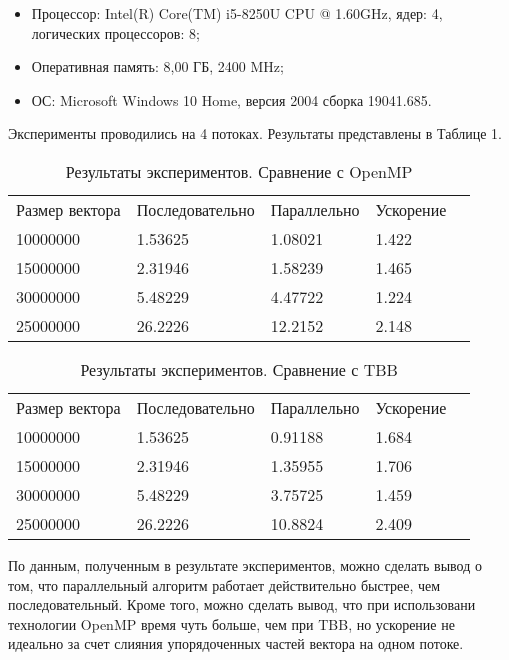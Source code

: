 \documentclass{report}
\begin{document}
\begin{itemize}
\item Процессор: Intel(R) Core(TM) i5-8250U CPU @ 1.60GHz, ядер: 4, логических процессоров: 8;
\item Оперативная память: 8,00 ГБ, 2400 MHz;
\item ОС: Microsoft Windows 10 Home, версия 2004 сборка 19041.685.
\end{itemize}

\par Эксперименты проводились на 4 потоках. Результаты представлены в Таблице 1.

\begin{table}[!h]
\caption{Результаты экспериментов. Сравнение с OpenMP}
\centering
\begin{tabular}{lllll}
Размер вектора & Последовательно & Параллельно & Ускорение   \\
10000000       & 1.53625         & 1.08021     & 1.422       \\
15000000       & 2.31946         & 1.58239     & 1.465       \\
30000000       & 5.48229         & 4.47722     & 1.224       \\
25000000       & 26.2226         & 12.2152     & 2.148       \\
\end{tabular}
\end{table}

\begin{table}[!h]
\caption{Результаты экспериментов. Сравнение с TBB}
\centering
\begin{tabular}{lllll}
Размер вектора & Последовательно & Параллельно & Ускорение   \\
10000000       & 1.53625         & 0.91188     & 1.684       \\
15000000       & 2.31946         & 1.35955     & 1.706       \\
30000000       & 5.48229         & 3.75725     & 1.459       \\
25000000       & 26.2226         & 10.8824     & 2.409       \\
\end{tabular}
\end{table}

\par По данным, полученным в результате экспериментов, можно сделать вывод о том, что параллельный алгоритм работает действительно быстрее, чем последовательный. Кроме того, можно сделать вывод, что при использовани технологии OpenMP время чуть больше, чем при TBB, но ускорение не идеально за счет слияния упорядоченных частей вектора на одном потоке.
\end{document}
